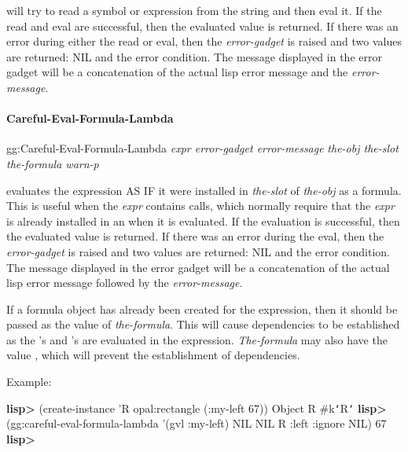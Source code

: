  will try to read a symbol or expression from the
string and then eval it.  If the read and eval are successful, then the
evaluated value is returned.  If there was an error during either the read
or eval, then the {\it error-gadget} is raised and two values are returned:
NIL and the error condition.  The message displayed in the error gadget will
be a concatenation of the actual lisp error message and the {\it error-message}.


\paragraph{Careful-Eval-Formula-Lambda}

\begin{programexample}
gg:Careful-Eval-Formula-Lambda {\it expr  error-gadget  error-message} \value{function}
                               {\it the-obj  the-slot  the-formula  warn-p}
\end{programexample}

 evaluates the expression AS IF it were
installed in {\it the-slot} of {\it the-obj} as a formula.  This is useful when
the {\it expr} contains  calls, which normally require that the {\it expr}
is already installed in an  when it is evaluated.
If the evaluation is successful, then the evaluated
value is returned.  If there was an error during the eval, then the
{\it error-gadget} is raised and two values are returned: NIL and the error
condition.  The message displayed in the error gadget will be a
concatenation of the actual lisp error message followed by the
{\it error-message}.

If a formula object has already been created for the expression, then it
should be passed as the value of {\it the-formula}.  This will cause dependencies
to be established as the 's and 's are evaluated in the
expression.  {\it The-formula} may also have the value , which will
prevent the establishment of dependencies.

\vspace{1 line}
\begin{group}
Example:

\begin{programexample}
{\bf lisp>} (create-instance 'R opal:rectangle
        (:my-left 67))
Object R
\#k{\tt\char`\<}R{\tt\char`\>}
{\bf lisp>} (gg:careful-eval-formula-lambda '(gvl :my-left) NIL NIL
                                        R :left :ignore NIL)
67
{\bf lisp>}
\end{programexample}
\end{group}





